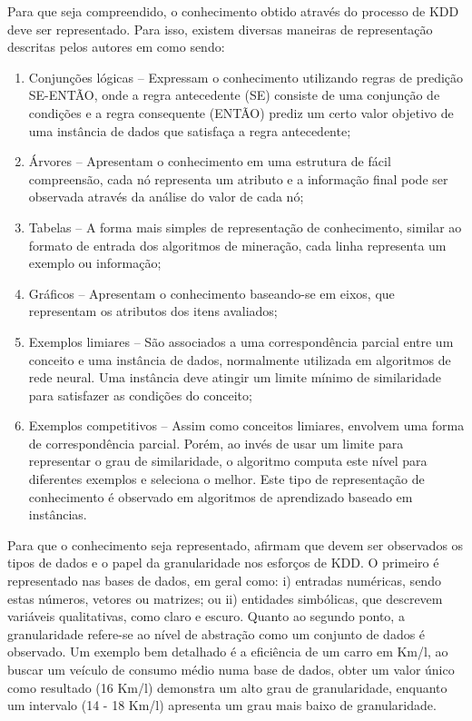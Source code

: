 Para que seja compreendido, o conhecimento obtido através do processo de KDD deve ser representado. Para isso, existem diversas maneiras de representação descritas pelos autores em  como sendo:

\begin{enumerate}[label=\roman*.]
    \item Conjunções lógicas {--} Expressam o conhecimento utilizando regras de predição SE\hyp{}ENTÃO, onde a regra antecedente (SE) consiste de uma conjunção de condições e a regra consequente (ENTÃO) prediz um certo valor objetivo de uma instância de dados que satisfaça a regra antecedente;
    \item Árvores {--} Apresentam o conhecimento em uma estrutura de fácil compreensão, cada nó representa um atributo e a informação final pode ser observada através da análise do valor de cada nó;
    \item Tabelas {--} A forma mais simples de representação de conhecimento, similar ao formato de entrada dos algoritmos de mineração, cada linha representa um exemplo ou informação;
    \item Gráficos {--} Apresentam o conhecimento baseando\hyp{}se em eixos, que representam os atributos dos itens avaliados;
    \item Exemplos limiares {--} São associados a uma correspondência parcial entre um conceito e uma instância de dados, normalmente utilizada em algoritmos de rede neural. Uma instância deve atingir um limite mínimo de similaridade para satisfazer as condições do conceito;
    \item Exemplos competitivos {--} Assim como conceitos limiares, envolvem uma forma de correspondência parcial. Porém, ao invés de usar um limite para representar o grau de similaridade, o algoritmo computa este nível para diferentes exemplos e seleciona o melhor. Este tipo de representação de conhecimento é observado em algoritmos de aprendizado baseado em instâncias.
\end{enumerate}

Para que o conhecimento seja representado,  afirmam que devem ser observados os tipos de dados e o papel da granularidade nos esforços de KDD. O primeiro é representado nas bases de dados, em geral como: i) entradas numéricas, sendo estas números, vetores ou matrizes; ou ii) entidades simbólicas, que descrevem variáveis qualitativas, como claro e escuro. Quanto ao segundo ponto, a granularidade refere\hyp{}se ao nível de abstração como um conjunto de dados é observado. Um exemplo bem detalhado é a eficiência de um carro em Km/l, ao buscar um veículo de consumo médio numa base de dados, obter um valor único como resultado (16 Km/l) demonstra um alto grau de granularidade, enquanto um intervalo (14 - 18 Km/l) apresenta um grau mais baixo de granularidade.

